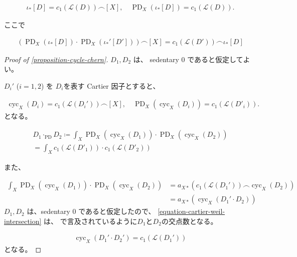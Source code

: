 \documentclass[a4paper,dvipdfmx,reqno,12pt]{amsart}
\theoremstyle{definition}
\newcommand{\deq}{\coloneqq}
\newcommand{\opn}[1]{\operatorname{#1}}
\numberwithin{equation}{section}
\begin{document}
\begin{align}
\iota_*[D]=c_1(\mathcal{L}(D))\frown [X], \quad
\opn{PD}_X(\iota_*[D])=c_1(\mathcal{L}(D)).
\end{align}

ここで

\begin{align}
(\opn{PD}_X(\iota_*[D])\cdot \opn{PD}_X(\iota_*'[D']))\frown [X]=
c_1(\mathcal{L}(D'))\frown \iota_*[D]
\end{align}

\begin{proof}[{Proof of \cref{proposition-cycle-chern}}]

$D_1,D_2$ は、 sedentary 0 であると仮定してよい。

$D_i'$ ($i=1,2$) を $D_i$を表す Cartier 因子とすると、

\begin{align}
\opn{cyc}_X(D_i)=c_1(\mathcal{L}(D_i'))\frown [X], \quad
\opn{PD}_X(\opn{cyc}_X(D_i))=c_1(\mathcal{L}(D'_i)).
\end{align}
となる。

\begin{align}
D_1\cdot_{\opn{PD}} D_2
\deq \int_X \opn{PD}_X(\opn{cyc}_X(D_1))\cdot \opn{PD}_X(\opn{cyc}_X(D_2))\\
=\int_X c_1(\mathcal{L}(D'_1))\cdot c_1(\mathcal{L}(D'_2))
\end{align}

また、

\begin{align}
\int_X \opn{PD}_X(\opn{cyc}_X(D_1))\cdot 
\opn{PD}_X(\opn{cyc}_X(D_2))& =
a_{X*} (c_1(\mathcal{L}(D_1')) \frown \opn{cyc}_X(D_2)) \\
& =a_{X*}(\opn{cyc}_X(D_1'\cdot D_2)) 
\label{equation-cartier-weil-intersection}
\end{align}
$D_1,D_2$ は、sedentary 0 であると仮定したので、
\cref{equation-cartier-weil-intersection}
は、\cite{shaw2015tropical,demedrano2023chern}
で言及されているように$D_1$と$D_2$の交点数となる。

\begin{align}
\opn{cyc}_X(D_1'\cdot D_2')=c_1(\mathcal{L}(D_1'))
\end{align}
となる。
\end{proof}




\end{document}
